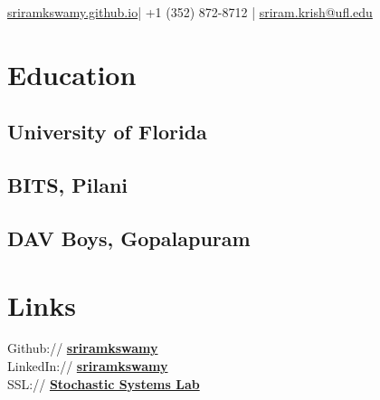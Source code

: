\documentclass[]{resume}
\begin{document}
%
%

%
%
{\href{http://sriramkswamy.github.io}{sriramkswamy.github.io}|
	+1 (352) 872-8712	| \href{mailto:sriram.krish@ufl.edu}{sriram.krish@ufl.edu}
}

%
%

\begin{minipage}[t]{0.33\textwidth}


\section{Education}

\subsection{University of Florida}
\sectionsep

\subsection{BITS, Pilani}
\sectionsep

\subsection{DAV Boys, Gopalapuram}
\sectionsep


\section{Links}
Github:// \href{https://github.com/sriramkswamy}{\bf sriramkswamy} \\
LinkedIn://  \href{https://www.linkedin.com/in/sriramkswamy}{\bf sriramkswamy} \\
SSL://  \href{http://web.mae.ufl.edu/~mrinalkumar/Research/research.html}{\bf Stochastic Systems Lab} \\


\end{minipage}
\end{document}
